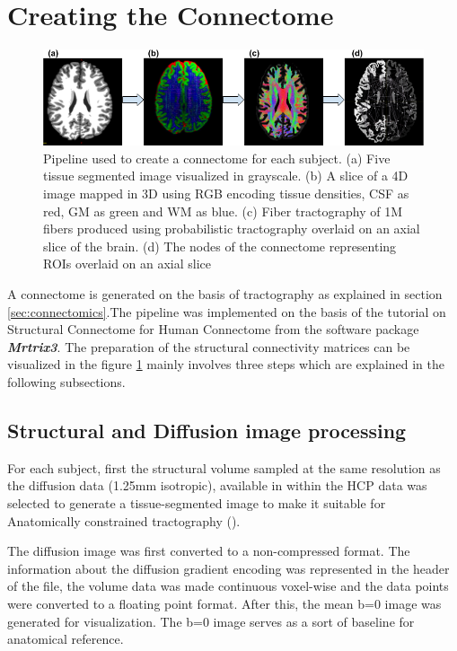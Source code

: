 \documentclass[msthesis.tex]{subfiles}
\begin{document}
\section{Creating the Connectome}
\begin{figure}
    \centering
    \includegraphics[width=\textwidth]{images/Preprocessing_pipeline.png}
    \caption{Pipeline used to create a connectome for each subject. (a) Five tissue segmented image visualized in grayscale. (b) A slice of a 4D image mapped in 3D using RGB encoding tissue densities, CSF as red, GM as green and WM as blue. (c) Fiber tractography of 1M fibers produced using probabilistic tractography overlaid on an axial slice of the brain. (d) The nodes of the connectome representing ROIs overlaid on an axial slice}
    \label{fig:preproc}
\end{figure}
A connectome is generated on the basis of tractography as explained in section \ref{sec:connectomics}.The pipeline was implemented on the basis of the tutorial on Structural Connectome for Human Connectome from the software package \textbf{\textit{Mrtrix3}}. The preparation of the structural connectivity matrices can be visualized in the figure \ref{fig:preproc} mainly involves three steps which are explained in the following subsections.

\subsection{Structural  and Diffusion image processing}
\label{subsec:struct_diff}
For each subject, first the structural volume sampled at the same resolution as the diffusion data (1.25mm isotropic), available in within the HCP data was selected to generate a tissue-segmented image to make it suitable for Anatomically constrained tractography (\cite{anattractsmith}).


The diffusion image was first converted to a non-compressed format. The information about the diffusion gradient encoding was represented in the header of the file, the volume data was made continuous voxel-wise and the data points were converted to a floating point format. 
After this, the mean b=0 image was generated for visualization. The b=0 image serves as a sort of baseline for anatomical reference.
\end{document}
